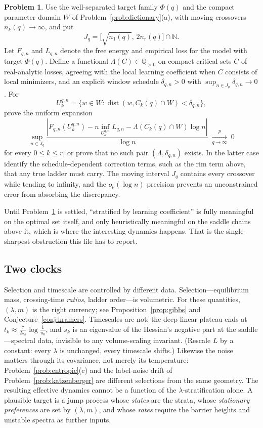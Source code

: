 \documentclass[11pt]{amsart}
\theoremstyle{plain}
\theoremstyle{definition}
\newtheorem{problem}[theorem]{Problem}
\newcommand{\Q}{\mathbb{Q}}
\newcommand{\dist}{\operatorname{dist}}
\begin{document}
\begin{problem}\label{prob:saddle-free-energy}
Use the well-separated target family $\Phi(q)$ and the compact parameter domain $W$ of Problem~\ref{prob:dictionary}(a), with moving crossovers $n_k(q)\to\infty$, and put
\[
   J_q=\bigl[\sqrt{n_1(q)},\,2n_r(q)\bigr]\cap\mathbb{N}.
\]
Let $F_{q,n}$ and $L_{q,n}$ denote the free energy and empirical loss for the model with target $\Phi(q)$. Define a functional $\Lambda(C) \in \Q_{>0}$ on compact critical sets $C$ of real-analytic losses, agreeing with the local learning coefficient when $C$ consists of local minimizers, and an explicit window schedule $\delta_{q,n}>0$ with $\sup_{n\in J_q}\delta_{q,n}\to0$. For
\[
   U_{k}^{q,n}
   =
   \{w\in W:\dist(w,C_k(q)\cap W)<\delta_{q,n}\},
\]
prove the uniform expansion
\[
   \sup_{n\in J_q}
   \frac{\left|
   F_{q,n}(U_k^{q,n})
   -n\inf_{U_k^{q,n}}L_{q,n}
   -\Lambda(C_k(q)\cap W)\log n
   \right|}{\log n}
   \;\xrightarrow[q\to\infty]{p}\;0
\]
for every $0\le k\le r$, or prove that no such pair $(\Lambda,\delta_{q,n})$ exists. In the latter case identify the schedule-dependent correction terms, such as the rim term above, that any true ladder must carry. The moving interval $J_q$ contains every crossover while tending to infinity, and the $o_p(\log n)$ precision prevents an unconstrained error from absorbing the discrepancy.
\end{problem}

Until Problem~\ref{prob:saddle-free-energy} is settled, ``stratified by learning coefficient'' is fully meaningful on the optimal set itself, and only heuristically meaningful on the saddle chains above it, which is where the interesting dynamics happens. That is the single sharpest obstruction this file has to report.

\subsection{Two clocks}\label{sec:two-clocks}

Selection and timescale are controlled by different data. Selection---equilibrium mass, crossing-time \emph{ratios}, ladder order---is volumetric. For these quantities, $(\lambda,m)$ is the right currency; see Proposition~\ref{prop:gibbs} and Conjecture~\ref{conj:kramers}. Timescales are not: the deep-linear plateau ends at $t_k \approx \tfrac{\tau}{2 s_k} \log \tfrac{1}{u_0}$, and $s_k$ is an eigenvalue of the Hessian's negative part at the saddle---spectral data, invisible to any volume-scaling invariant. (Rescale $L$ by a constant: every $\lambda$ is unchanged, every timescale shifts.) Likewise the noise matters through its covariance, not merely its temperature: Problem~\ref{prob:entropic}(c) and the label-noise drift of Problem~\ref{prob:katzenberger} are different selections from the same geometry. The resulting effective dynamics cannot be a function of the $\lambda$-stratification alone. A plausible target is a jump process whose \emph{states} are the strata, whose \emph{stationary preferences} are set by $(\lambda, m)$, and whose \emph{rates} require the barrier heights and unstable spectra as further inputs.
\end{document}
